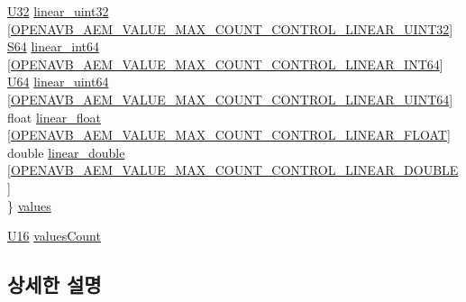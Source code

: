 \begin{DoxyCompactItemize}
\begin{tabbing}
\>\hyperlink{openavb__types__base__pub_8h_a696390429f2f3b644bde8d0322a24124}{U32} \hyperlink{structopenavb__aecp__commandresponse__data__set__control__t_a3505f0d5403a1f209788246b210d6422}{linear\_uint32} \mbox{[}\hyperlink{openavb__aem__types__pub_8h_a959df5b9317184e15dba0d2c1fd7382c}{OPENAVB\_AEM\_VALUE\_MAX\_COUNT\_CONTROL\_LINEAR\_UINT32}\mbox{]}\\
\>\hyperlink{openavb__types__base__pub_8h_a1d293e5c494dd6826239b02f5fe98e7f}{S64} \hyperlink{structopenavb__aecp__commandresponse__data__set__control__t_a6ecce63e7b6ac372b12a08319d5cfb56}{linear\_int64} \mbox{[}\hyperlink{openavb__aem__types__pub_8h_ae00ad286a8aa4b0f37d5e4f1a07e83b2}{OPENAVB\_AEM\_VALUE\_MAX\_COUNT\_CONTROL\_LINEAR\_INT64}\mbox{]}\\
\>\hyperlink{openavb__types__base__pub_8h_a25809e0734a149248fcf5831efa4e33d}{U64} \hyperlink{structopenavb__aecp__commandresponse__data__set__control__t_a401addc8dd65267950393edcd4e6e0bf}{linear\_uint64} \mbox{[}\hyperlink{openavb__aem__types__pub_8h_a30cfe39a24c8072db5519b5945a352de}{OPENAVB\_AEM\_VALUE\_MAX\_COUNT\_CONTROL\_LINEAR\_UINT64}\mbox{]}\\
\>float \hyperlink{structopenavb__aecp__commandresponse__data__set__control__t_a5a346af0ca505581807d6ed0ec84a85e}{linear\_float} \mbox{[}\hyperlink{openavb__aem__types__pub_8h_aed5cb64f9b113261651036808d6989ff}{OPENAVB\_AEM\_VALUE\_MAX\_COUNT\_CONTROL\_LINEAR\_FLOAT}\mbox{]}\\
\>double \hyperlink{structopenavb__aecp__commandresponse__data__set__control__t_a4ac1f60ad606687e4dd294549ff9db69}{linear\_double} \mbox{[}\hyperlink{openavb__aem__types__pub_8h_a272a2e87471f6c68a6b6adce07fb001b}{OPENAVB\_AEM\_VALUE\_MAX\_COUNT\_CONTROL\_LINEAR\_DOUBLE}\mbox{]}\\
\} \hyperlink{structopenavb__aecp__commandresponse__data__set__control__t_a7b56a329473e9e0c055e1940df0767a6}{values}\\

\end{tabbing}\item 
\hyperlink{openavb__types__base__pub_8h_a0a0a322d5fa4a546d293a77ba8b4a71f}{U16} \hyperlink{structopenavb__aecp__commandresponse__data__set__control__t_a264345a5327a88764d6dc9b6ad3abc1f}{values\+Count}
\end{DoxyCompactItemize}


\subsection{상세한 설명}


